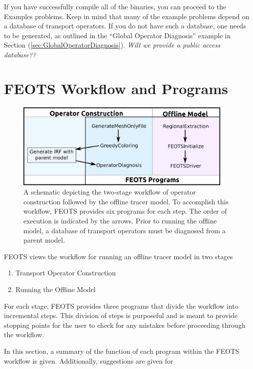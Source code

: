 \documentclass{softwaremanual}
\begin{document}
If you have successfully compile all of the binaries, you can proceed to the Examples problems. Keep in mind that many of the example problems depend on a database of transport operators. If you do not have such a database, one needs to be generated, as outlined in the ``Global Operator Diagnosis'' example in Section (\ref{sec:GlobalOperatorDiagnosis}). \textit{Will we provide a public access database??}

\chapter{FEOTS Workflow and Programs}
\begin{figure}[h!]
\begin{center}
\includegraphics[width=0.95\textwidth]{workflow.eps}
\caption{A schematic depicting the two-stage workflow of operator construction followed by the offline tracer model. To accomplish this workflow, FEOTS provides six programs for each step. The order of execution is indicated by the arrows. Prior to running the offline model, a database of transport operators must be diagnosed from a parent model. }\label{fig:workflow}
\end{center}
\end{figure}


FEOTS views the workflow for running an offline tracer model in two stages 
\begin{enumerate}
\item Transport Operator Construction

\item Running the Offline Model
\end{enumerate}

For each stage, FEOTS provides three programs that divide the workflow into incremental steps. This division of steps is purposeful and is meant to provide stopping points for the user to check for any mistakes before proceeding through the workflow.

In this section, a summary of the function of each program within the FEOTS workflow is given. Additionally, suggestions are given for 
\end{document}
